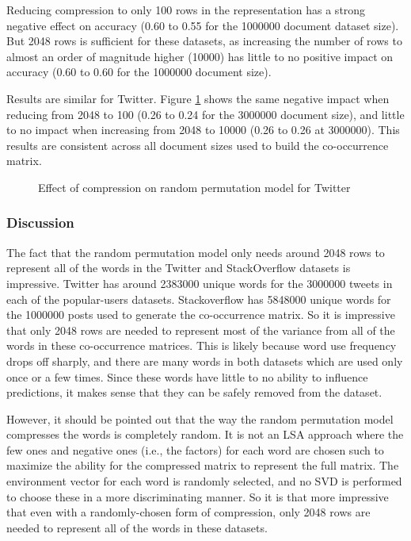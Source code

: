 \documentclass[man,floatsintext,donotrepeattitle]{apa6}
\begin{document}
Reducing compression to only 100 rows in the representation has a strong negative effect on accuracy (\num{.60} to \num{.55} for the \num{1000000} document dataset size).
But \num{2048} rows is sufficient for these datasets,
as increasing the number of rows to almost an order of magnitude higher (\num{10000}) has little to no positive impact on accuracy (\num{.60} to \num{.60} for the \num{1000000} document size). 

Results are similar for Twitter.
Figure \ref{figContextDimT} shows the same negative impact when reducing from \num{2048} to \num{100} (\num{.26} to \num{.24} for the \num{3000000} document size),
and little to no impact when increasing from \num{2048} to \num{10000} (\num{.26} to \num{.26} at \num{3000000}).
This results are consistent across all document sizes used to build the co-occurrence matrix.

\begin{figure}[!htbp]
  \caption{Effect of compression on random permutation model for Twitter}
  \label{figContextDimT}
\end{figure}

\subsubsection{Discussion}

The fact that the random permutation model only needs around \num{2048} rows to represent all of the words in the Twitter and StackOverflow datasets is impressive.
Twitter has around \num{2383000} unique words for the \num{3000000} tweets in each of the popular-users datasets.
Stackoverflow has \num{5848000} unique words for the \num{1000000} posts used to generate the co-occurrence matrix.
So it is impressive that only \num{2048} rows are needed to represent most of the variance from all of the words in these co-occurrence matrices.
This is likely because word use frequency drops off sharply, and there are many words in both datasets which are used only once or a few times.
Since these words have little to no ability to influence predictions, it makes sense that they can be safely removed from the dataset.

However, it should be pointed out that the way the random permutation model compresses the words is completely random.
It is not an LSA approach where the few ones and negative ones (i.e., the factors) for each word are chosen such to maximize the ability for the compressed matrix to represent the full matrix.
The environment vector for each word is randomly selected, and no SVD is performed to choose these in a more discriminating manner.
So it is that more impressive that even with a randomly-chosen form of compression, only \num{2048} rows are needed to represent all of the words in these datasets.
\end{document}
